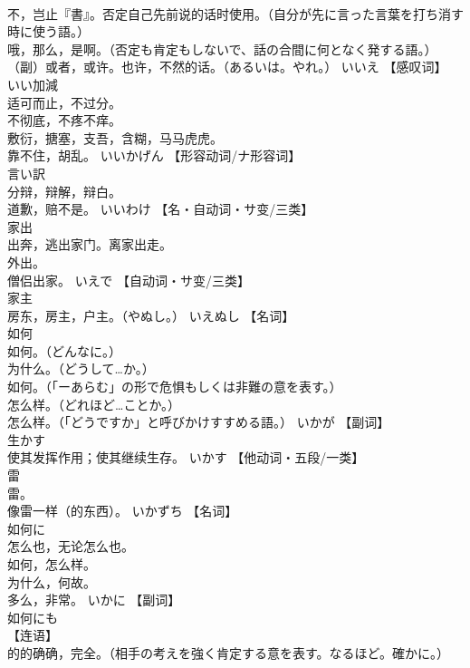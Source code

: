 \documentclass[8pt]{extreport}
\begin{document}
\begin{CJK}{UTF8}{min}
\\	不，岂止『書』。否定自己先前说的话时使用。（自分が先に言った言葉を打ち消す時に使う語。） 
\\	哦，那么，是啊。（否定も肯定もしないで、話の合間に何となく発する語。） 
\\	（副）或者，或许。也许，不然的话。（あるいは。やれ。）	いいえ		【感叹词】
\\	いい加減	
\\	适可而止，不过分。 
\\	不彻底，不疼不痒。 
\\	敷衍，搪塞，支吾，含糊，马马虎虎。 
\\	靠不住，胡乱。	いいかげん		【形容动词/ナ形容词】
\\	言い訳	
\\	分辩，辩解，辩白。 
\\	道歉，赔不是。	いいわけ		【名・自动词・サ变/三类】
\\	家出	
\\	出奔，逃出家门。离家出走。 
\\	外出。 
\\	僧侣出家。	いえで		【自动词・サ变/三类】
\\	家主	
\\	房东，房主，户主。（やぬし。）	いえぬし		【名词】
\\	如何	
\\	如何。（どんなに。） 
\\	为什么。（どうして…か。） 
\\	如何。（「ーあらむ」の形で危惧もしくは非難の意を表す。） 
\\	怎么样。（どれほど…ことか。） 
\\	怎么样。（「どうですか」と呼びかけすすめる語。）	いかが		【副词】
\\	生かす	
\\	使其发挥作用；使其继续生存。	いかす		【他动词・五段/一类】
\\	雷	
\\	雷。 
\\	像雷一样（的东西）。	いかずち		【名词】
\\	如何に	
\\	怎么也，无论怎么也。 
\\	如何，怎么样。 
\\	为什么，何故。 
\\	多么，非常。	いかに		【副词】
\\	如何にも	
\\	【连语】 
\\	的的确确，完全。（相手の考えを強く肯定する意を表す。なるほど。確かに。） 

\end{CJK}
\end{document}
